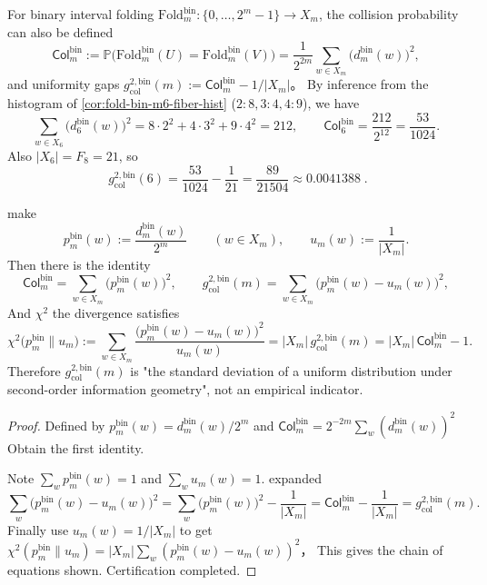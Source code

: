 \begin{remark}[\texorpdfstring{$m=6$}{m=6}’s uniformity gap numerical anchor point (bin-fold)]\label{rem:fold-bin-m6-col-gap}
For binary interval folding \(\mathrm{Fold}^{\mathrm{bin}}_m:\{0,\dots,2^m-1\}\to X_m\), the collision probability can also be defined
\[
\mathsf{Col}^{\mathrm{bin}}_m:=\mathbb{P}\bigl(\mathrm{Fold}^{\mathrm{bin}}_m(U)=\mathrm{Fold}^{\mathrm{bin}}_m(V)\bigr)
=\frac{1}{2^{2m}}\sum_{w\in X_m}\bigl(d^{\mathrm{bin}}_m(w)\bigr)^2,
\]
and uniformity gaps
\(
g_{\mathrm{col}}^{2,\mathrm{bin}}(m):=\mathsf{Col}^{\mathrm{bin}}_m-1/|X_m|
\)。
By inference from the histogram of \ref{cor:fold-bin-m6-fiber-hist} (\(2:8,3:4,4:9\)), we have
\[
\sum_{w\in X_6}\bigl(d^{\mathrm{bin}}_6(w)\bigr)^2
=8\cdot 2^2+4\cdot 3^2+9\cdot 4^2
=212,
\qquad
\mathsf{Col}^{\mathrm{bin}}_6=\frac{212}{2^{12}}=\frac{53}{1024}.
\]
Also \(|X_6|=F_8=21\), so
\[
\boxed{\;
g_{\mathrm{col}}^{2,\mathrm{bin}}(6)=\frac{53}{1024}-\frac{1}{21}
=\frac{89}{21504}\approx 0.0041388\; }.
\]
\end{remark}

\begin{proposition}\label{prop:fold-bin-chi2-col}
make
\[
p^{\mathrm{bin}}_m(w):=\frac{d^{\mathrm{bin}}_m(w)}{2^m}\qquad (w\in X_m),
\qquad
u_m(w):=\frac{1}{|X_m|}.
\]
Then there is the identity
\[
\mathsf{Col}^{\mathrm{bin}}_m=\sum_{w\in X_m}\bigl(p^{\mathrm{bin}}_m(w)\bigr)^2,
\qquad
g_{\mathrm{col}}^{2,\mathrm{bin}}(m)=\sum_{w\in X_m}\bigl(p^{\mathrm{bin}}_m(w)-u_m(w)\bigr)^2,
\]
And \(\chi^2\) the divergence satisfies
\[
\chi^2\!\bigl(p^{\mathrm{bin}}_m\|u_m\bigr)
:=\sum_{w\in X_m}\frac{\bigl(p^{\mathrm{bin}}_m(w)-u_m(w)\bigr)^2}{u_m(w)}
=|X_m|\,g_{\mathrm{col}}^{2,\mathrm{bin}}(m)
=|X_m|\,\mathsf{Col}^{\mathrm{bin}}_m-1.
\]
Therefore \(g_{\mathrm{col}}^{2,\mathrm{bin}}(m)\) is "the standard deviation of a uniform distribution under second-order information geometry", not an empirical indicator.
\end{proposition}
\begin{proof}
Defined by \(p^{\mathrm{bin}}_m(w)=d^{\mathrm{bin}}_m(w)/2^m\) and
\(
\mathsf{Col}^{\mathrm{bin}}_m
=2^{-2m}\sum_{w}(d^{\mathrm{bin}}_m(w))^2
\)
Obtain the first identity.
\par
Note \(\sum_w p^{\mathrm{bin}}_m(w)=1\) and \(\sum_w u_m(w)=1\). expanded
\[
\sum_w\bigl(p^{\mathrm{bin}}_m(w)-u_m(w)\bigr)^2
=\sum_w \bigl(p^{\mathrm{bin}}_m(w)\bigr)^2-\frac{1}{|X_m|}
=\mathsf{Col}^{\mathrm{bin}}_m-\frac{1}{|X_m|}
=g_{\mathrm{col}}^{2,\mathrm{bin}}(m).
\]
Finally use \(u_m(w)=1/|X_m|\) to get
\(
\chi^2(p^{\mathrm{bin}}_m\|u_m)=|X_m|\sum_w(p^{\mathrm{bin}}_m(w)-u_m(w))^2
\)，
This gives the chain of equations shown. Certification completed.
\end{proof}

